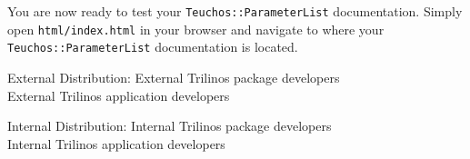 \documentclass[pdf,ps2pdf,12pt]{smemo}
\begin{document}
\begin{memo}
\begin{enumerate}
 \end{enumerate}

 You are now ready to test your \texttt{Teuchos::ParameterList}
 documentation.  Simply open \texttt{html/index.html} in your browser
 and navigate to where your \texttt{Teuchos::ParameterList}
 documentation is located.










    \clearpage
    \begin{distribution}{External Distribution:}
	\normalfont
        External Trilinos package developers \\
        External Trilinos application developers
    \end{distribution}

    \begin{distribution}{Internal Distribution:}
	\normalfont
        Internal Trilinos package developers \\
        Internal Trilinos application developers
    \end{distribution}

    \end{memo}
\end{document}
